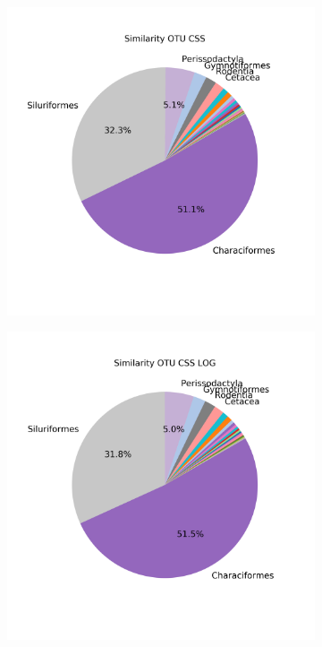 \begin{figure}[h]
\begin{subfigure}{0.45\textwidth}
		\caption{}
		\label{fig:simmeanotucsslog}
	\end{subfigure}\\
	\begin{subfigure}{0.45\textwidth}
	\includegraphics[width=\textwidth]{rfr_sim_sum_pieOTU CSS}
	\caption{}
	\label{fig:simsumotucss}
	\end{subfigure}
	\begin{subfigure}{0.45\textwidth}
	\includegraphics[width=\textwidth]{rfr_sim_sum_pieOTU CSS LOG}
	\caption{}
	\label{fig:simsumotucsslog}
	\end{subfigure}


\end{figure}
